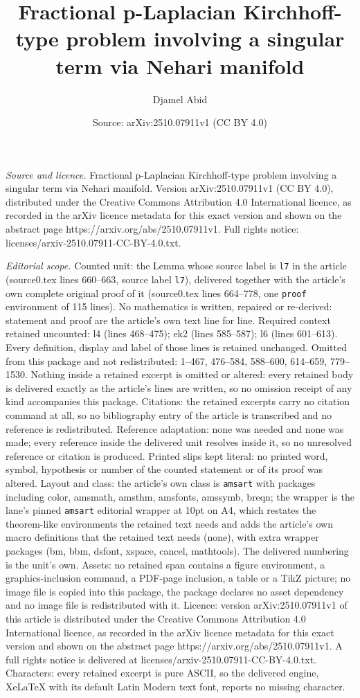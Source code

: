 \documentclass[10pt,a4paper]{amsart}
\title[Fractional p-Laplacian Kirchhoff-type problem involving a si]{Fractional p-Laplacian Kirchhoff-type problem involving a singular term via Nehari manifold}
\author{Djamel Abid}
\date{Source: arXiv:2510.07911v1 (CC BY 4.0)}
\begin{document}
\maketitle

\noindent\emph{Source and licence.} Fractional p-Laplacian Kirchhoff-type problem involving a singular term via Nehari manifold. Version arXiv:2510.07911v1 (CC BY 4.0), distributed under the Creative Commons Attribution 4.0 International licence, as recorded in the arXiv licence metadata for this exact version and shown on the abstract page https://arxiv.org/abs/2510.07911v1. Full rights notice: licenses/arxiv-2510.07911-CC-BY-4.0.txt.\par\smallskip

\noindent\textit{Editorial scope.} Counted unit: the Lemma whose source label is \texttt{l7} in the article (source0.tex lines 660--663, source label \texttt{l7}), delivered together with the article's own complete original proof of it (source0.tex lines 664--778, one \texttt{proof} environment of 115 lines). No mathematics is written, repaired or re-derived: statement and proof are the article's own text line for line. Required context retained uncounted: l4 (lines 468--475); ek2 (lines 585--587); l6 (lines 601--613). Every definition, display and label of those lines is retained unchanged. Omitted from this package and not redistributed: 1--467, 476--584, 588--600, 614--659, 779--1530. Nothing inside a retained excerpt is omitted or altered: every retained body is delivered exactly as the article's lines are written, so no omission receipt of any kind accompanies this package. Citations: the retained excerpts carry no citation command at all, so no bibliography entry of the article is transcribed and no reference is redistributed. Reference adaptation: none was needed and none was made; every reference inside the delivered unit resolves inside it, so no unresolved reference or citation is produced. Printed slips kept literal: no printed word, symbol, hypothesis or number of the counted statement or of its proof was altered. Layout and class: the article's own class is \texttt{amsart} with packages including color, amsmath, amsthm, amsfonts, amssymb, breqn; the wrapper is the lane's pinned \texttt{amsart} editorial wrapper at 10pt on A4, which restates the theorem-like environments the retained text needs and adds the article's own macro definitions that the retained text needs (none), with extra wrapper packages (bm, bbm, dsfont, xspace, cancel, mathtools). The delivered numbering is the unit's own. Assets: no retained span contains a figure environment, a graphics-inclusion command, a PDF-page inclusion, a table or a TikZ picture; no image file is copied into this package, the package declares no asset dependency and no image file is redistributed with it. Licence: version arXiv:2510.07911v1 of this article is distributed under the Creative Commons Attribution 4.0 International licence, as recorded in the arXiv licence metadata for this exact version and shown on the abstract page https://arxiv.org/abs/2510.07911v1. A full rights notice is delivered at licenses/arxiv-2510.07911-CC-BY-4.0.txt. Characters: every retained excerpt is pure ASCII, so the delivered engine, XeLaTeX with its default Latin Modern text font, reports no missing character.
\end{document}
